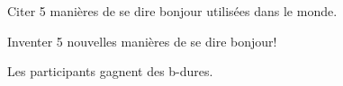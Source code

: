 \documentclass{grand-jeu}
\begin{document}
\begin{liste-materiel}
\end{liste-materiel}

\begin{regles}
Citer 5 manières de se dire bonjour utilisées dans le monde.

Inventer 5 nouvelles manières de se dire bonjour!

Les participants gagnent des b-dures.

\end{regles}

\begin{imaginaire}

\end{imaginaire}

\begin{moments-stop}
\end{moments-stop}
\end{document}
